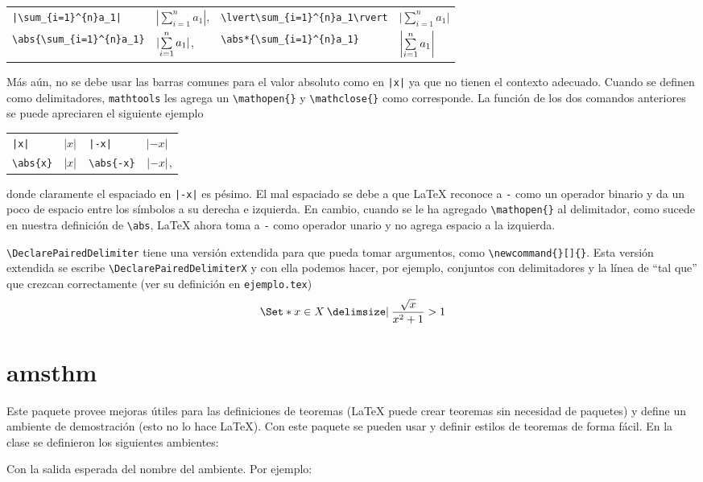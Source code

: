 \begin{tabular}{llll}
  \verb+|\sum_{i=1}^{n}a_1|+ & \(|\sum\limits_{i=1}^{n}a_1|\), &
  \verb|\lvert\sum_{i=1}^{n}a_1\rvert| &
  \(\lvert\sum\limits_{i=1}^{n}a_1\rvert \) \\[4ex]
  \verb|\abs{\sum_{i=1}^{n}a_1}| & \(\abs{\sum\limits_{i=1}^{n}a_1}\), &
  \verb|\abs*{\sum_{i=1}^{n}a_1}| & \(\abs*{\sum\limits_{i=1}^{n}a_1}\)
\end{tabular}

Más aún, no se debe usar las barras comunes para el valor absoluto como en \verb+|x|+ ya que no tienen el contexto adecuado. Cuando se definen como delimitadores, \texttt{mathtools} les agrega un \verb|\mathopen{}| y \verb|\mathclose{}| como corresponde. La función de los dos comandos anteriores se puede apreciaren el siguiente ejemplo

\begin{tabular}{llll}
  \verb+|x|+ & \(|x|\) & \verb¡|-x|¡ & \(|-x|\)\\
  \verb+\abs{x}+ & \(\abs{x}\) & \verb+\abs{-x}+ & \(\abs{-x}\),
\end{tabular}

\noindent donde claramente el espaciado en \verb¡|-x|¡ es pésimo. El mal espaciado se debe a que \LaTeX{} reconoce a \verb|-| como un operador binario y da un poco de espacio entre los símbolos a su derecha e izquierda. En cambio, cuando se le ha agregado \verb|\mathopen{}| al delimitador, como sucede en nuestra definición de \verb|\abs|, \LaTeX{} ahora toma a \verb|-| como operador unario y no agrega espacio a la izquierda.

\verb|\DeclarePairedDelimiter| tiene una versión extendida para que pueda
tomar argumentos, como \verb|\newcommand{}[]{}|. Esta versión extendida se
escribe \verb|\DeclarePairedDelimiterX| y con ella podemos hacer, por
ejemplo, conjuntos  con delimitadores y la línea de \enquote{tal que} que
crezcan correctamente (ver su definición en \texttt{ejemplo.tex})
\[
  \Set*{ x \in X \given \frac{\sqrt{x}}{x^2+1} > 1 }
\]


\section{amsthm}
Este paquete provee mejoras útiles para las definiciones de teoremas
(\LaTeX{} puede crear teoremas sin necesidad de paquetes) y
define un ambiente de demostración (esto no lo hace \LaTeX{}). Con este
paquete se pueden usar y definir estilos de teoremas de forma fácil. En la clase se definieron los siguientes ambientes:
\begin{center}
\end{center}
Con la salida esperada del nombre del ambiente. Por ejemplo:

